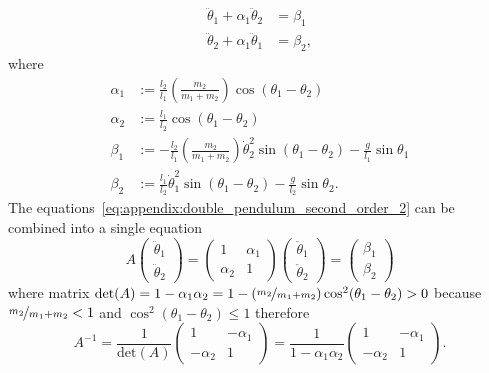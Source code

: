   \begin{equation}
    \label{eq:appendix:double_pendulum_second_order_2}
    \begin{aligned}
      \ddot{\theta}_1 + \alpha_1
      \ddot{\theta}_2 & = \beta_1 \\ \ddot{\theta}_2 + \alpha_1 \ddot{\theta}_1 & = \beta_2,
    \end{aligned}
  \end{equation}
  where \begin{equation} \begin{aligned} \alpha_1 &:=
  \frac{l_2}{l_1} \left( \frac{m_2}{m_1 + m_2} \right)\cos(\theta_1 - \theta_2) \\ \alpha_2 &:=
  \frac{l_1}{l_2} \cos(\theta_1 - \theta_2) \\ \beta_1 &:= -\frac{l_2}{l_1} \left(
  \frac{m_2}{m_1 + m_2} \right) \dot{\theta}_2^2 \sin(\theta_1 - \theta_2) - \frac{g}{l_1}
  \sin\theta_1 \\ \beta_2 &:= \frac{l_1}{l_2} \dot{\theta}_1^2 \sin(\theta_1 - \theta_2) -
  \frac{g}{l_2}\sin\theta_2.
\end{aligned}
\end{equation}
The equations~\eqref{eq:appendix:double_pendulum_second_order_2} can be combined into a single
  equation
  \begin{equation}
    \label{eq:appendix:double_pendulum_operator_form} A
    \begin{pmatrix}
      \ddot{\theta}_1 \\ \ddot{\theta}_2
    \end{pmatrix}
    =
    \begin{pmatrix}
      1 & \alpha_1 \\ \alpha_2 &
         1
    \end{pmatrix}
    \begin{pmatrix}
      \ddot{\theta}_1 \\ \ddot{\theta}_2
    \end{pmatrix}
    =
    \begin{pmatrix}
      \beta_1 \\ \beta_2
    \end{pmatrix}
  \end{equation}
  where matrix $\mathrm{det}(A)
    = 1 - \alpha_1 \alpha_2 = 1 - (\nicefrac{m_2}{m_1 + m_2})\cos^2(\theta_1 - \theta_2) > 0$
  because $\nicefrac{m_2}{m_1 + m_2} < 1$ and $\cos^2(\theta_1 - \theta_2) \leq 1$ therefore
  \begin{equation} A^{-1} = \frac{1}{\mathrm{det}(A)}
  \begin{pmatrix}
    1 & -\alpha_1 \\ -\alpha_2
      & 1
  \end{pmatrix}
  = \frac{1}{1 - \alpha_1\alpha_2}
  \begin{pmatrix}
    1 & -\alpha_1 \\ -\alpha_2
      & 1
  \end{pmatrix}
  .
\end{equation}

